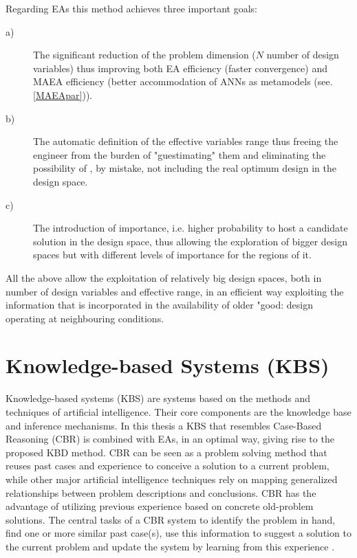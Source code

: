 Regarding EAs this method achieves three important goals: 
\begin{description}
  \item[a)]The significant reduction of the problem dimension ($N$ number of design variables) thus improving both EA efficiency (faster convergence) and MAEA efficiency (better accommodation of ANNs as metamodels (see.\ref{MAEApar})). 
  \item[b)]The automatic definition of the effective variables range thus freeing the engineer from the burden of "guestimating" them and eliminating the possibility of , by mistake, not including the real optimum design in the design space.
    \item[c)]The introduction of importance, i.e. higher probability to host a candidate solution in the design space, thus allowing the exploration of bigger design spaces but with different levels of importance for the regions of it.
\end{description}
All the above allow the exploitation of relatively big design spaces, both in number of design variables and effective range, in an efficient way exploiting the information that is incorporated in the availability of older "good: design operating at neighbouring conditions.     

\section{Knowledge-based Systems (KBS)}  
Knowledge-based systems (KBS) are systems based on the methods and techniques of artificial intelligence. Their core components are the knowledge base and inference mechanisms. In this thesis a KBS that resembles Case-Based Reasoning (CBR) is combined with EAs, in an optimal way, giving rise to the proposed KBD method. CBR can be seen as a problem solving method that reuses past cases and experience to conceive a solution to a current problem, 
while other major artificial intelligence techniques rely on mapping generalized 
relationships between problem descriptions and conclusions. CBR has the advantage 
of utilizing previous experience based on concrete old-problem solutions. 
The central tasks of a CBR system to identify the problem in hand, find one or 
more similar past case(s), use this information to suggest a solution to the current 
problem and update the system by learning from this experience \cite{kolodner_1991,kolodner_1993,slade_1991,riesbeck_1989}.      

